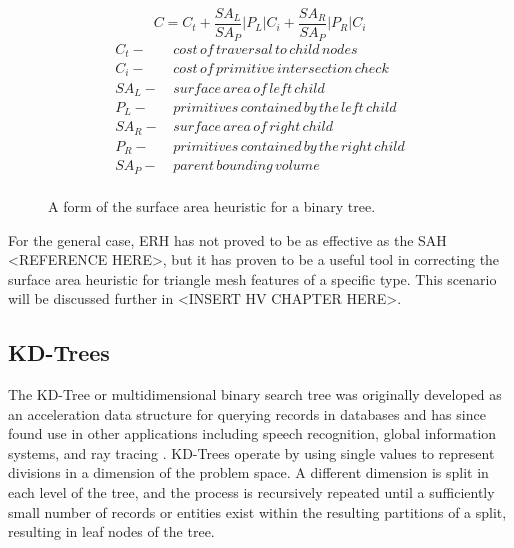 \begin{figure}[H]
  \begin{equation}
    C =  C_{t} + \frac{SA_{L}}{SA_{P}} |P_{L}|C_{i} +  \frac{SA_{R}}{SA_{P}} |P_{R}|C_{i}
    \label{eq:SAH}
  \end{equation}
  \begin{align*}
    C_{t} - & \,cost\, of\, traversal\, to\, child\, nodes \\
    C_{i} - & \, cost\, of\, primitive\, intersection\, check\, \\
    SA_{L} - &  \,surface\, area\, of\, left\, child \\
    P_{L} - & \, primitives\, contained\, by\, the\, left\, child  \\
    SA_{R} - & \, surface\, area\, of\, right\, child \\
    P_{R} - & \, primitives\, contained\, by\, the\, right\, child \\
    SA_{P} - & \, parent\, bounding\, volume \\
  \end{align*}
  \caption{A form of the surface area heuristic for a binary tree.}
  \label{fig:SAH}
\end{figure}

For the general case, ERH has not proved to be as effective as the SAH <REFERENCE HERE>, but it
has proven to be a useful tool in correcting the surface area heuristic for
triangle mesh features of a specific type. This scenario will be discussed further
in <INSERT HV CHAPTER HERE>.

\subsection{KD-Trees}
\label{subsec:kd-trees}
The KD-Tree or multidimensional binary search tree was originally developed as
an acceleration data structure for querying records in databases and has since
found use in other applications including speech recognition, global information
systems, and ray tracing \cite{Bentley_1975}. KD-Trees operate by using single
values to represent divisions in a dimension of the problem space. A different
dimension is split in each level of the tree, and the process is recursively
repeated until a sufficiently small number of records or entities exist within
the resulting partitions of a split, resulting in leaf nodes of the tree.

